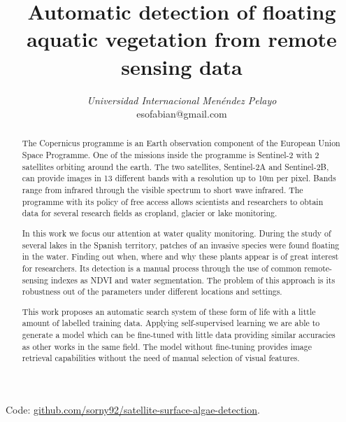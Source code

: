 \documentclass[conference]{IEEEtran}
\begin{document}
    \title{Automatic detection of floating aquatic vegetation from remote sensing data}

    \author{
    \textit{Universidad Internacional Menéndez Pelayo}\\
    esofabian@gmail.com}

    \maketitle

    \begin{abstract}
        The Copernicus programme is an Earth observation component of the European Union Space Programme.
        One of the missions inside the programme is Sentinel-2 with 2 satellites orbiting around the earth.
        The two satellites, Sentinel-2A and Sentinel-2B, can provide images in 13 different bands with a resolution up
        to 10m per pixel.
        Bands range from infrared through the visible spectrum to short wave infrared.
        The programme with its policy of free access allows scientists and researchers to obtain data for several
        research fields as cropland, glacier or lake monitoring.

        In this work we focus our attention at water quality monitoring.
        During the study of several lakes in the Spanish territory, patches of an invasive species were found floating in the water.
        Finding out when, where and why these plants appear is of great interest for researchers.
        Its detection is a manual process through the use of common remote-sensing indexes as NDVI and water segmentation.
        The problem of this approach is its robustness out of the parameters under different locations and settings.

        This work proposes an automatic search system of these form of life with a little amount of labelled training data.
        Applying self-supervised learning we are able to generate a model which can be fine-tuned with little data providing similar
        accuracies as other works in the same field.
        The model without fine-tuning provides image retrieval capabilities without the need of manual selection of visual features.
    \end{abstract}
    \newline
    Code: \href{https://github.com/sorny92/satellite-surface-algae-detection}{github.com/sorny92/satellite-surface-algae-detection}.
    \newline
\end{document}
